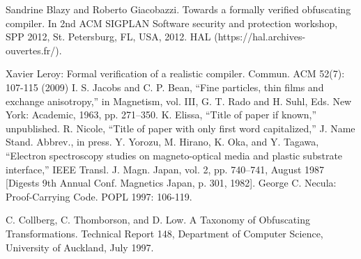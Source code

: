 \documentclass[compsoc,conference,a4paper,10pt,times]{IEEEtran}
\begin{document}
\begin{thebibliography}{00}
 Sandrine Blazy and Roberto Giacobazzi. Towards a formally verified obfuscating compiler. In 2nd ACM SIGPLAN Software security and protection
workshop, SPP 2012, St. Petersburg, FL, USA, 2012. HAL (https://hal.archives-ouvertes.fr/).

 	Xavier Leroy:
Formal verification of a realistic compiler. Commun. ACM 52(7): 107-115 (2009)
 I. S. Jacobs and C. P. Bean, ``Fine particles, thin films and exchange anisotropy,'' in Magnetism, vol. III, G. T. Rado and H. Suhl, Eds. New York: Academic, 1963, pp. 271--350.
 K. Elissa, ``Title of paper if known,'' unpublished.
 R. Nicole, ``Title of paper with only first word capitalized,'' J. Name Stand. Abbrev., in press.
 Y. Yorozu, M. Hirano, K. Oka, and Y. Tagawa, ``Electron spectroscopy studies on magneto-optical media and plastic substrate interface,'' IEEE Transl. J. Magn. Japan, vol. 2, pp. 740--741, August 1987 [Digests 9th Annual Conf. Magnetics Japan, p. 301, 1982].
 George C. Necula: Proof-Carrying Code. POPL 1997: 106-119. 

 C. Collberg, C. Thomborson, and D. Low.
A Taxonomy of Obfuscating Transformations.
Technical Report 148, Department of Computer Science, University of Auckland, July 1997.
\end{thebibliography}
\end{document}
